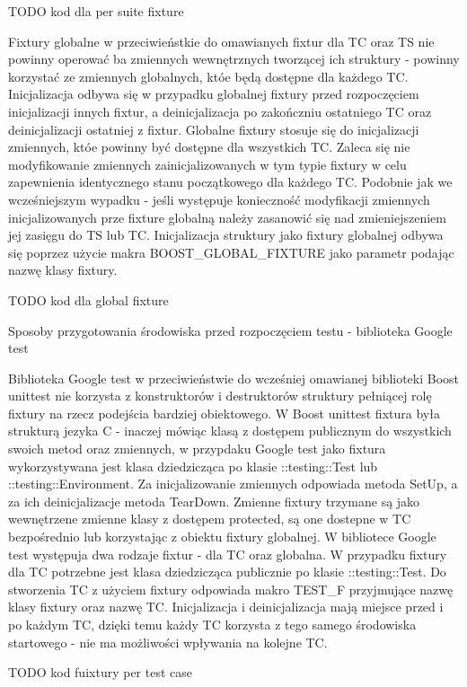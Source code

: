 TODO kod dla per suite fixture

Fixtury globalne w przeciwieństkie do omawianych fixtur dla TC oraz TS nie powinny operować ba zmiennych wewnętrznych tworzącej ich struktury - powinny korzystać ze zmiennych globalnych, któe będą dostępne dla każdego TC.
Inicjalizacja odbywa się w przypadku globalnej fixtury przed rozpoczęciem inicjalizacji innych fixtur, a deinicjalizacja po zakończniu ostatniego TC oraz deinicjalizacji ostatniej z fixtur.
Globalne fixtury stosuje się do inicjalizacji zmiennych, któe powinny być dostępne dla wszystkich TC. Zaleca się nie modyfikowanie zmiennych zainicjalizowanych w tym typie fixtury w celu zapewnienia identycznego stanu początkowego dla każdego TC.
Podobnie jak we wcześniejszym wypadku - jeśli występuje konieczność modyfikacji zmiennych inicjalizowanych prze fixture globalną należy zasanowić się nad zmieniejszeniem jej zasięgu do TS lub TC.
Inicjalizacja struktury jako fixtury globalnej odbywa się poprzez użycie makra BOOST_GLOBAL_FIXTURE jako parametr podając nazwę klasy fixtury.

TODO kod dla global fixture

Sposoby przygotowania środowiska przed rozpoczęciem testu - biblioteka Google test

Biblioteka Google test w przeciwieństwie do wcześniej omawianej biblioteki Boost unittest nie korzysta z konstruktorów i destruktorów struktury pełniącej rolę fixtury na rzecz podejścia bardziej obiektowego.
W Boost unittest fixtura była strukturą jezyka C - inaczej mówiąc klasą z dostępem publicznym do wszystkich swoich metod oraz zmiennych, w przypdaku Google test jako fixtura wykorzystywana jest klasa dziedzicząca po klasie ::testing::Test lub ::testing::Environment.
Za inicjalizowanie zmiennych odpowiada metoda SetUp, a za ich deinicjalizacje metoda TearDown.
Zmienne fixtury trzymane są jako wewnętrzene zmienne klasy z dostępem protected, są one dostepne w TC bezpośrednio lub korzystając z obiektu fixtury globalnej.
W bibliotece Google test występuja dwa rodzaje fixtur - dla TC oraz globalna.
W przypadku fixtury dla TC potrzebne jest klasa dziedzicząca publicznie po klasie ::testing::Test. Do stworzenia TC z użyciem fixtury odpowiada makro TEST_F przyjmujące nazwę klasy fixtury oraz nazwę TC. Inicjalizacja i deinicjalizacja mają miejsce przed i po każdym TC, dzięki temu każdy TC korzysta z tego samego środowiska startowego - nie ma możliwości wpływania na kolejne TC.

TODO kod fuixtury per test case


